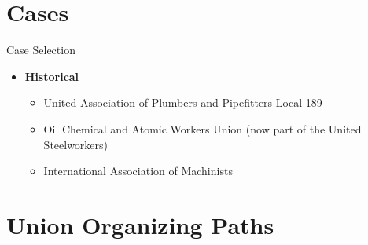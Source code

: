 \documentclass{beamer}
\begin{document}
\section{Cases}
\begin{frame}{Case Selection}
	\begin{itemize}
		\item \textbf{Historical}
		\begin{itemize}
			\item United Association of Plumbers and Pipefitters Local 189
			\item Oil Chemical and Atomic Workers Union (now part of the United Steelworkers)
			\item International Association of Machinists
		\end{itemize}
	\end{itemize}
\end{frame}

\section{Union Organizing Paths}
%    
%    
%
\end{document}
